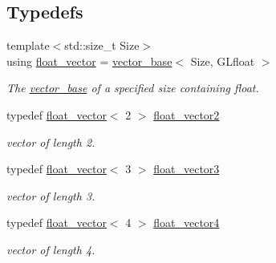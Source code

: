 \subsection*{Typedefs}
\begin{DoxyCompactItemize}
\item 
{\footnotesize template$<$std\+::size\+\_\+t Size$>$ }\\using \hyperlink{namespaceglpp_a6c618584338a9ebf15759cea2401f0ae}{float\+\_\+vector} = \hyperlink{classglpp_1_1vector__base}{vector\+\_\+base}$<$ Size, G\+Lfloat $>$
\begin{DoxyCompactList}\small\item\em The \hyperlink{classglpp_1_1vector__base}{vector\+\_\+base} of a specified size containing {\ttfamily float}. \end{DoxyCompactList}\item 
typedef \hyperlink{namespaceglpp_a6c618584338a9ebf15759cea2401f0ae}{float\+\_\+vector}$<$ 2 $>$ \hyperlink{namespaceglpp_ace2f7da7495fc7d1623d97a444c87146}{float\+\_\+vector2}
\begin{DoxyCompactList}\small\item\em vector of length 2. \end{DoxyCompactList}\item 
typedef \hyperlink{namespaceglpp_a6c618584338a9ebf15759cea2401f0ae}{float\+\_\+vector}$<$ 3 $>$ \hyperlink{namespaceglpp_a3fa7b207a8b7dba583fb22731a616d73}{float\+\_\+vector3}
\begin{DoxyCompactList}\small\item\em vector of length 3. \end{DoxyCompactList}\item 
typedef \hyperlink{namespaceglpp_a6c618584338a9ebf15759cea2401f0ae}{float\+\_\+vector}$<$ 4 $>$ \hyperlink{namespaceglpp_ab4a3d7b8ed8e2e4810006eef5213a460}{float\+\_\+vector4}
\begin{DoxyCompactList}\small\item\em vector of length 4. \end{DoxyCompactList}\end{DoxyCompactItemize}
